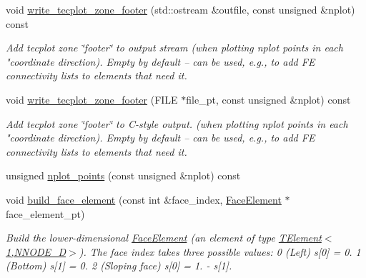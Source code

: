 \begin{DoxyCompactItemize}
void \hyperlink{classoomph_1_1TElement_3_012_00_01NNODE__1D_01_4_a1bc5afa4920836278400df77012cb1c3}{write\+\_\+tecplot\+\_\+zone\+\_\+footer} (std\+::ostream \&outfile, const unsigned \&nplot) const
\begin{DoxyCompactList}\small\item\em Add tecplot zone \char`\"{}footer\char`\"{} to output stream (when plotting nplot points in each "coordinate direction). Empty by default -- can be used, e.\+g., to add FE connectivity lists to elements that need it. \end{DoxyCompactList}\item 
void \hyperlink{classoomph_1_1TElement_3_012_00_01NNODE__1D_01_4_ae1fbb81a92bd1966ae7653afbe7eb593}{write\+\_\+tecplot\+\_\+zone\+\_\+footer} (F\+I\+LE $\ast$file\+\_\+pt, const unsigned \&nplot) const
\begin{DoxyCompactList}\small\item\em Add tecplot zone \char`\"{}footer\char`\"{} to C-\/style output. (when plotting nplot points in each "coordinate direction). Empty by default -- can be used, e.\+g., to add FE connectivity lists to elements that need it. \end{DoxyCompactList}\item 
unsigned \hyperlink{classoomph_1_1TElement_3_012_00_01NNODE__1D_01_4_ad0c4aa55367140690c697ded11f234c0}{nplot\+\_\+points} (const unsigned \&nplot) const
\item 
void \hyperlink{classoomph_1_1TElement_3_012_00_01NNODE__1D_01_4_adf9dd8fa1e2dedc481adfea443e8a926}{build\+\_\+face\+\_\+element} (const int \&face\+\_\+index, \hyperlink{classoomph_1_1FaceElement}{Face\+Element} $\ast$face\+\_\+element\+\_\+pt)
\begin{DoxyCompactList}\small\item\em Build the lower-\/dimensional \hyperlink{classoomph_1_1FaceElement}{Face\+Element} (an element of type \hyperlink{classoomph_1_1TElement_3_011_00_01NNODE__1D_01_4}{T\+Element$<$1,\+N\+N\+O\+D\+E\+\_\+D$>$}). The face index takes three possible values\+: 0 (Left) s\mbox{[}0\mbox{]} = 0. 1 (Bottom) s\mbox{[}1\mbox{]} = 0. 2 (Sloping face) s\mbox{[}0\mbox{]} = 1. -\/ s\mbox{[}1\mbox{]}. \end{DoxyCompactList}\end{DoxyCompactItemize}
